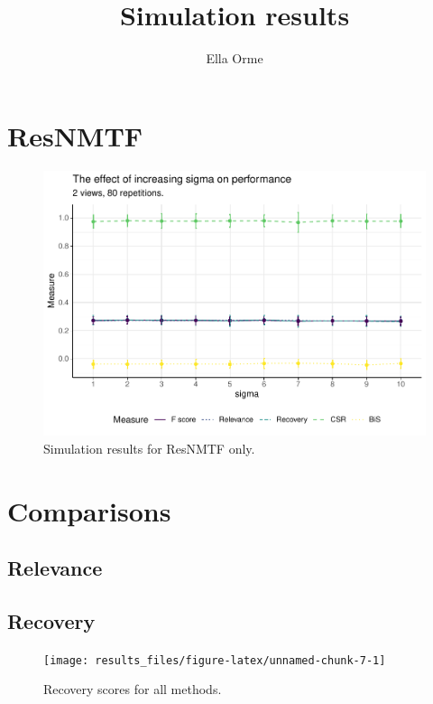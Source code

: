 \documentclass[
]{article}
\title{Simulation results}
\author{Ella Orme}
\date{}
\begin{document}
\maketitle

\hypertarget{resnmtf}{%
\section{ResNMTF}\label{resnmtf}}

\begin{figure}[H]

{\centering \includegraphics{results_files/figure-latex/unnamed-chunk-3-1} 

}

\caption{Simulation results for ResNMTF only.}\label{fig:unnamed-chunk-3}
\end{figure}

\hypertarget{comparisons}{%
\section{Comparisons}\label{comparisons}}

\hypertarget{relevance}{%
\subsection{Relevance}\label{relevance}}

\hypertarget{recovery}{%
\subsection{Recovery}\label{recovery}}

\begin{figure}[H]

{\centering \texttt{[image: results\_files/figure-latex/unnamed-chunk-7-1]} 

}

\caption{Recovery scores for all methods.}\label{fig:unnamed-chunk-7}
\end{figure}
\end{document}
